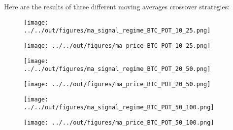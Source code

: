 Here are the results of three different moving averages crossover strategies:

\begin{figure}[!ht]
    \centering
    \texttt{[image: ../../out/figures/ma\_signal\_regime\_BTC\_POT\_10\_25.png]}
    \label{fig:figure1}
\end{figure}

\begin{figure}[!ht]
    \centering
    \texttt{[image: ../../out/figures/ma\_price\_BTC\_POT\_10\_25.png]}
    \label{fig:figure2}
\end{figure}

\begin{figure}[!ht]
    \centering
    \texttt{[image: ../../out/figures/ma\_signal\_regime\_BTC\_POT\_20\_50.png]}
    \label{fig:figure3}
\end{figure}

\begin{figure}[!ht]
    \centering
    \texttt{[image: ../../out/figures/ma\_price\_BTC\_POT\_20\_50.png]}
    \label{fig:figure4}
\end{figure}

\begin{figure}[!ht]
    \centering
    \texttt{[image: ../../out/figures/ma\_signal\_regime\_BTC\_POT\_50\_100.png]}
    \label{fig:figure5}
\end{figure}

\begin{figure}[!ht]
    \centering
    \texttt{[image: ../../out/figures/ma\_price\_BTC\_POT\_50\_100.png]}
    \label{fig:figure6}
\end{figure}

{}



